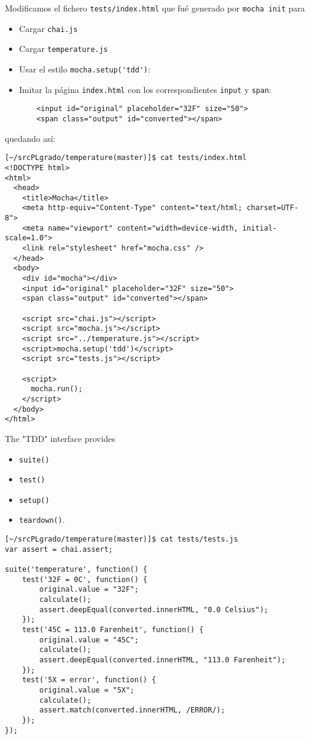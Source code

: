 
Modificamos el fichero \verb|tests/index.html| que fué generado por \verb|mocha init|
para 
\begin{itemize}
\item
Cargar \verb|chai.js|
\item
Cargar \verb|temperature.js|
\item
Usar el estilo \verb|mocha.setup('tdd')|:
\item
Imitar la página \verb|index.html| con los correspondientes \verb|input| y 
\verb|span|:
\begin{verbatim}
    <input id="original" placeholder="32F" size="50">
    <span class="output" id="converted"></span>
\end{verbatim}
\end{itemize}
quedando así:
\begin{verbatim}
[~/srcPLgrado/temperature(master)]$ cat tests/index.html 
<!DOCTYPE html>
<html>
  <head>
    <title>Mocha</title>
    <meta http-equiv="Content-Type" content="text/html; charset=UTF-8">
    <meta name="viewport" content="width=device-width, initial-scale=1.0">
    <link rel="stylesheet" href="mocha.css" />
  </head>
  <body>
    <div id="mocha"></div>
    <input id="original" placeholder="32F" size="50">
    <span class="output" id="converted"></span>

    <script src="chai.js"></script>
    <script src="mocha.js"></script>
    <script src="../temperature.js"></script>
    <script>mocha.setup('tdd')</script>
    <script src="tests.js"></script>

    <script>
      mocha.run();
    </script>
  </body>
</html>
\end{verbatim}


The "TDD" interface provides 
\begin{itemize}
\item \verb|suite()|
\item  \verb|test()|
\item  \verb|setup()|
\item  \verb|teardown()|.
\end{itemize}

\begin{verbatim}
[~/srcPLgrado/temperature(master)]$ cat tests/tests.js 
var assert = chai.assert;

suite('temperature', function() {
    test('32F = 0C', function() {
        original.value = "32F";
        calculate();
        assert.deepEqual(converted.innerHTML, "0.0 Celsius");
    });
    test('45C = 113.0 Farenheit', function() {
        original.value = "45C";
        calculate();
        assert.deepEqual(converted.innerHTML, "113.0 Farenheit");
    });
    test('5X = error', function() {
        original.value = "5X";
        calculate();
        assert.match(converted.innerHTML, /ERROR/);
    });
});
\end{verbatim}

